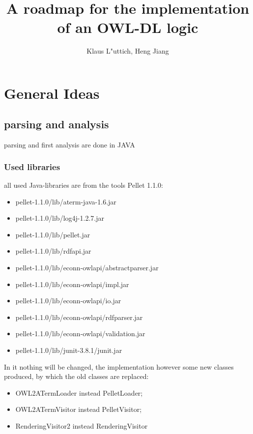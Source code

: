 \documentclass[11pt,a4paper]{article}
\begin{document}
\title{A roadmap for the implementation of an OWL-DL logic}
\author{Klaus L"uttich, Heng Jiang}
\maketitle


\section{General Ideas}

\subsection{parsing and analysis}
parsing and first analysis are done in JAVA
   \subsubsection{Used libraries}
   all used Java-libraries are from the tools Pellet 1.1.0:
   \begin{itemize}
   \item pellet-1.1.0/lib/aterm-java-1.6.jar
   \item pellet-1.1.0/lib/log4j-1.2.7.jar
   \item pellet-1.1.0/lib/pellet.jar
   \item pellet-1.1.0/lib/rdfapi.jar  
   \item pellet-1.1.0/lib/econn-owlapi/abstractparser.jar
   \item pellet-1.1.0/lib/econn-owlapi/impl.jar
   \item pellet-1.1.0/lib/econn-owlapi/io.jar  
   \item pellet-1.1.0/lib/econn-owlapi/rdfparser.jar
   \item pellet-1.1.0/lib/econn-owlapi/validation.jar
   \item pellet-1.1.0/lib/junit-3.8.1/junit.jar
   \end{itemize}
In it nothing will be changed, the implementation however some new classes produced, by which the old classes are replaced:
   \begin{itemize}
      \item OWL2ATermLoader instead PelletLoader;
          \item OWL2ATermVisitor instead PelletVisitor;
      \item RenderingVisitor2 instead RenderingVisitor
   \end{itemize}
\end{document}
